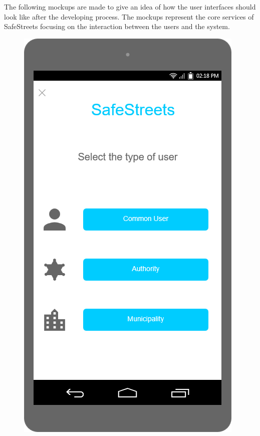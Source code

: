 \documentclass[a4paper]{article}
\newcommand{\mockupsize}{0.36\textwidth}
\begin{document}
The following mockups are made to give an idea of how the user
interfaces should look like after the developing process. The mockups
represent the core services of SafeStreets focusing on the interaction
between the users and the system.

\vfill

\begin{figure}[H]
    \centering
    \begin{minipage}[t]{\mockupsize}
        \includegraphics[width=\textwidth]{mockup/choose_user}

\end{minipage}
\end{figure}
\end{document}
